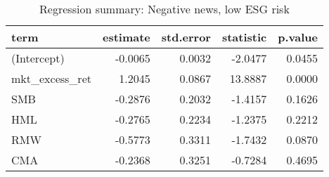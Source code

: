 \begin{table}[H]
\centering
\caption{Regression summary: Negative news, low ESG risk}
\begin{tabular}{lrrrr}
  \hline
term & estimate & std.error & statistic & p.value \\ 
  \hline
(Intercept) & -0.0065 & 0.0032 & -2.0477 & 0.0455 \\ 
  mkt\_excess\_ret & 1.2045 & 0.0867 & 13.8887 & 0.0000 \\ 
  SMB & -0.2876 & 0.2032 & -1.4157 & 0.1626 \\ 
  HML & -0.2765 & 0.2234 & -1.2375 & 0.2212 \\ 
  RMW & -0.5773 & 0.3311 & -1.7432 & 0.0870 \\ 
  CMA & -0.2368 & 0.3251 & -0.7284 & 0.4695 \\ 
   \hline
\end{tabular}
\label{tab: summary_neg_ESG_L}
\end{table}

